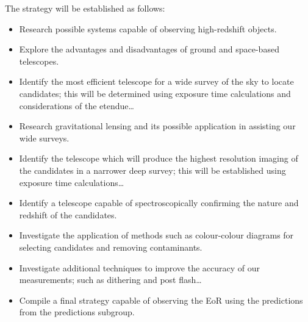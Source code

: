 	The strategy will be established as follows:
	\begin{itemize}
		\item Research possible systems capable of observing high-redshift objects.
		\item Explore the advantages and disadvantages of ground and space-based telescopes.
		\item Identify the most efficient telescope for a wide survey of the sky to locate candidates; this will be determined using exposure time calculations and considerations of the etendue\ldots
		\item Research gravitational lensing and its possible application in assisting our wide surveys.
		\item Identify the telescope which will produce the highest resolution imaging of the candidates in a narrower deep survey; this will be established using exposure time calculations\ldots
		\item Identify a telescope capable of spectroscopically confirming the nature and redshift of the candidates.
		\item Investigate the application of methods such as colour-colour diagrams for selecting candidates and removing contaminants.
		\item Investigate additional techniques to improve the accuracy of our measurements; such as dithering and post flash\ldots
		\item Compile a final strategy capable of observing the EoR using the predictions from the predictions subgroup.
	\end{itemize}

